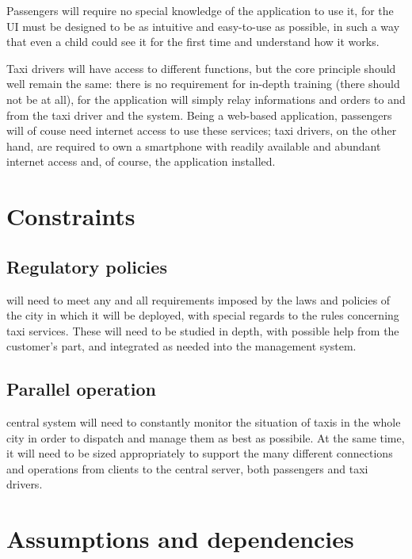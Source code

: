 Passengers will require no special knowledge of the application to use it, for the UI must be designed to be as intuitive and easy-to-use as possible, in such a way that even a child could see it for the first time and understand how it works.

Taxi drivers will have access to different functions, but the core principle should well remain the same: there is no requirement for in-depth training (there should not be at all), for the application will simply relay informations and  orders to and from the taxi driver and the system. Being a web-based application, passengers will of couse need internet access to use these services; taxi drivers, on the other hand, are required to own a smartphone with readily available and abundant internet access and, of course, the application installed.

\section{Constraints}

\subsection{Regulatory policies}
\mts{} will need to meet any and all requirements imposed by the laws and policies of the city in which it will be deployed, with special regards to the rules concerning taxi services. These will need to be studied in depth, with possible help from the customer's part, and integrated as needed into the management system.

\subsection{Parallel operation}
\mts{} central system will need to constantly monitor the situation of taxis in the whole city in order to dispatch and manage them as best as possibile. At the same time, it will need to be sized appropriately to support the many different connections and operations from clients to the central server, both passengers and taxi drivers.

\section{Assumptions and dependencies}
\label{sec:assumptions}

